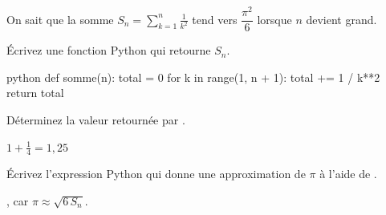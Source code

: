 \begin{question}[points=4]
  On sait que la somme $S_n = \displaystyle\sum_{k=1}^{n} \frac{1}{k^2}$
  tend vers $\dfrac{\pi^2}{6}$ lorsque $n$ devient grand.
  \begin{subquestion}[box=4.5cm]
    Écrivez une fonction Python  qui retourne $S_n$.
    \begin{solution}
\begin{code}[numbers=none]{python}
def somme(n):
    total = 0
    for k in range(1, n + 1):
        total += 1 / k**2
    return total
\end{code}
    \end{solution}
  \end{subquestion}
  \begin{subquestion}[lines=1]
    Déterminez la valeur retournée par .
    \begin{solution}
      $1 + \frac{1}{4} = 1{,}25$
    \end{solution}
  \end{subquestion}
  \begin{subquestion}[lines=2]
    Écrivez l'expression Python qui donne une approximation de $\pi$
    à l'aide de .
    \begin{solution}
      , car
      $\pi \approx \sqrt{6\,S_n}$.
    \end{solution}
  \end{subquestion}
\end{question}
